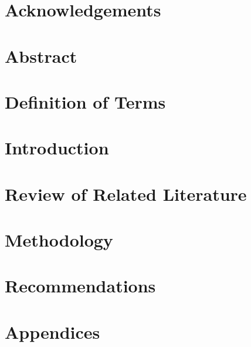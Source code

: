 \documentclass[12pt,oneside,listof=totoc,]{scrbook}
\begin{document}


\frontmatter
{}

\chapter{Acknowledgements}


\chapter{Abstract}


\tableofcontents
\listoftables
\listoffigures

\chapter{Definition of Terms}

\mainmatter
\doublespacing

\chapter{Introduction}


\chapter{Review of Related Literature}


\chapter{Methodology}


\chapter{Recommendations}




\appendix
\chapter{Appendices}

\end{document}

